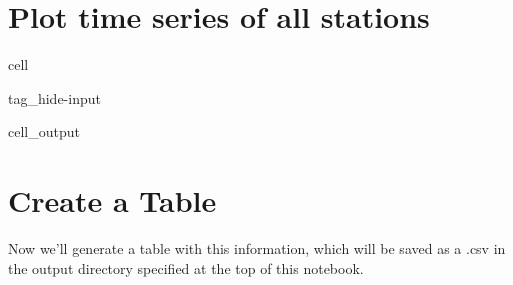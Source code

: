 \documentclass[letterpaper,10pt,english]{jupyterBook}
\begin{document}
\chapter{Plot time series of all stations}
\label{\detokenize{notebooks/FloodFrequency:plot-time-series-of-all-stations}}
\begin{sphinxuseclass}{cell}
\begin{sphinxuseclass}{tag_hide-input}\begin{sphinxVerbatimOutput}

\begin{sphinxuseclass}{cell_output}
\noindent{}

\end{sphinxuseclass}\end{sphinxVerbatimOutput}

\end{sphinxuseclass}
\end{sphinxuseclass}

\chapter{Create a Table}
\label{\detokenize{notebooks/FloodFrequency:create-a-table}}
\sphinxAtStartPar
Now we’ll generate a table with this information, which will be saved as a .csv in the output directory specified at the top of this notebook.
\end{document}
